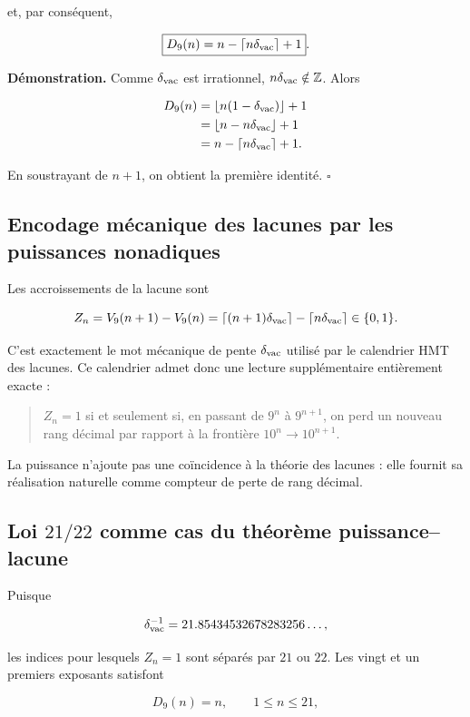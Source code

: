 et, par conséquent,

\[
\boxed{D_9(n)=n-\left\lceil n\delta_{\rm vac}\right\rceil+1}.
\]

\textbf{Démonstration.} Comme \(\delta_{\rm vac}\) est irrationnel, \(n\delta_{\rm vac}\notin\mathbb Z\). Alors

\[
\begin{aligned}
D_9(n)
&=\lfloor n(1-\delta_{\rm vac})\rfloor+1\\
&=\lfloor n-n\delta_{\rm vac}\rfloor+1\\
&=n-\lceil n\delta_{\rm vac}\rceil+1.
\end{aligned}
\]

En soustrayant de \(n+1\), on obtient la première identité. \(\square\)

\subsection{Encodage mécanique des lacunes par les puissances nonadiques}

Les accroissements de la lacune sont

\[
Z_n=V_9(n+1)-V_9(n)
=\lceil(n+1)\delta_{\rm vac}\rceil
-\lceil n\delta_{\rm vac}\rceil
\in\{0,1\}.
\]

C’est exactement le mot mécanique de pente \(\delta_{\rm vac}\) utilisé par le calendrier HMT des lacunes. Ce calendrier admet donc une lecture supplémentaire entièrement exacte :

\begin{quote}
\(Z_n=1\) si et seulement si, en passant de \(9^n\) à \(9^{n+1}\), on perd un nouveau rang décimal par rapport à la frontière \(10^n\to10^{n+1}\).
\end{quote}

La puissance n’ajoute pas une coïncidence à la théorie des lacunes : elle fournit sa réalisation naturelle comme compteur de perte de rang décimal.

\subsection{Loi \(21/22\) comme cas du théorème puissance--lacune}

Puisque

\[
\delta_{\rm vac}^{-1}
=21.85434532678283256\ldots,
\]

les indices pour lesquels \(Z_n=1\) sont séparés par \(21\) ou \(22\). Les vingt et un premiers exposants satisfont

\[
D_9(n)=n,\qquad1\le n\le21,
\]

